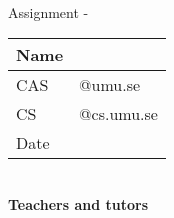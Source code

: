 \begin{titlepage}
	\thispagestyle{empty}
	\noindent {\large \MakeUppercase\university \\
				\instution \\
				\pagetypename \\
			  }

	\begin{center}
	\Large{\textbf{\titleFrontPage}}\\[7pt]

	\large{Assignment \assignmentnumber - \assignmentname}\\[19.7pt]
    
	\begin{tabular}{|p{2cm}|p{8cm}|}
		\hline
		Name &  \name\\\hline
		CAS & \casuser \hfill @umu.se \\\hline
		CS & \csuser \hfill @cs.umu.se \\\hline
		Date & \datemade\\ \hline
	\end{tabular}\\
	\vfill
	\large{\textbf{Teachers and tutors\\\graders}}\\

	\end{center}
	\thispagestyle{empty}
\end{titlepage}
